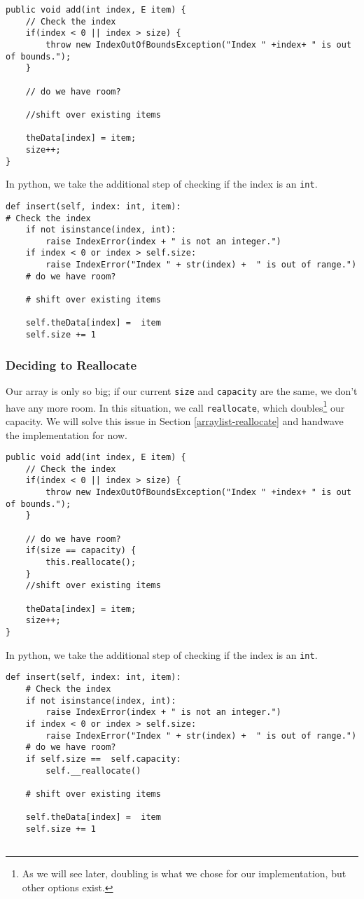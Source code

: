 \begin{verbatim}
public void add(int index, E item) {
	// Check the index
	if(index < 0 || index > size) {
		throw new IndexOutOfBoundsException("Index " +index+ " is out of bounds.");
	}
	
	// do we have room?
	
	//shift over existing items
	
	theData[index] = item;
	size++;
}
\end{verbatim}


In python, we take the additional step of checking if the index is an \texttt{int}.
\begin{verbatim}
def insert(self, index: int, item):
# Check the index
	if not isinstance(index, int):
		raise IndexError(index + " is not an integer.")
	if index < 0 or index > self.size:
		raise IndexError("Index " + str(index) +  " is out of range.")
	# do we have room?
	
	# shift over existing items
	
	self.theData[index] =  item
	self.size += 1

\end{verbatim}





\subsubsection{Deciding to Reallocate}
Our array is only so big; if our current \texttt{size} and \texttt{capacity} are the same, we don't have any more room.
In this situation, we call \texttt{reallocate}, which doubles\footnote{As we will see later, doubling is what we chose for our implementation, but other options exist.} our capacity.
We will solve this issue in Section \ref{arraylist-reallocate} and handwave the implementation for now.

\begin{verbatim}
public void add(int index, E item) {
	// Check the index
	if(index < 0 || index > size) {
		throw new IndexOutOfBoundsException("Index " +index+ " is out of bounds.");
	}
	
	// do we have room?
	if(size == capacity) { 
		this.reallocate();
	}
	//shift over existing items
	
	theData[index] = item;
	size++;
}
\end{verbatim}


In python, we take the additional step of checking if the index is an \texttt{int}.
\begin{verbatim}
def insert(self, index: int, item):
	# Check the index
	if not isinstance(index, int):
		raise IndexError(index + " is not an integer.")
	if index < 0 or index > self.size:
		raise IndexError("Index " + str(index) +  " is out of range.")
	# do we have room?
	if self.size ==  self.capacity:
		self.__reallocate()
	
	# shift over existing items
	
	self.theData[index] =  item
	self.size += 1
	
\end{verbatim}


